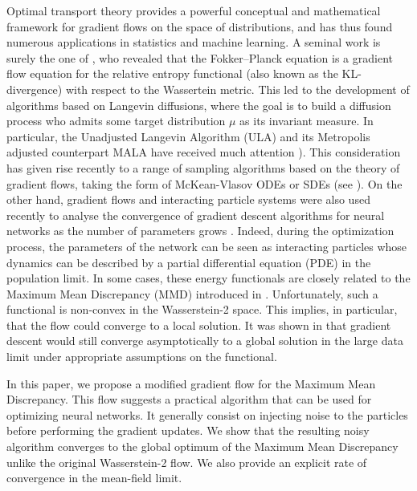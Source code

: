 Optimal transport   theory provides a powerful conceptual and mathematical framework for gradient flows on the space of distributions, and has thus found numerous applications in statistics and machine learning. A seminal work is surely the one of \cite{jordan1998variational}, who revealed that the Fokker–Planck equation is a gradient
flow equation for the relative entropy functional (also known as the KL-divergence) with respect to the Wassertein metric. %
This led to the development of algorithms based on Langevin diffusions, where the goal is to build a diffusion process who admits some target distribution $\mu$ as its invariant measure. In particular, the Unadjusted
Langevin Algorithm (ULA) and its Metropolis adjusted counterpart MALA have received much
attention \cite{durmus2018analysis}). This consideration has given rise recently to a range of sampling
algorithms based on the theory of gradient flows, taking the form of McKean-Vlasov ODEs or SDEs (see \cite{liu2017stein, csimcsekli2018sliced, bernton2018langevin}). On the other hand, gradient flows and interacting particle systems were also used recently to analyse the convergence of gradient descent algorithms for neural networks as the number of parameters grows \cite{chizat2018global,rotskoff2018neural,mei2018mean, sirignano2018mean, rotskoff2019global}. Indeed, during the optimization process, the parameters of the network can be seen as interacting particles whose dynamics can be described by a partial differential equation (PDE) in the population limit.%
In some cases, these energy functionals are closely related to the Maximum Mean Discrepancy (MMD) introduced in \cite{gretton2012kernel}. Unfortunately, such a functional is non-convex in the Wasserstein-2 space. This implies, in particular, that the flow could converge to a local solution.  It was shown in \cite{chizat2018global,rotskoff2019global} that gradient descent would still converge asymptotically to a global solution in the large data limit under appropriate assumptions on the functional. 

In this paper, we propose a modified gradient flow for the Maximum Mean Discrepancy. This flow suggests a practical algorithm that can be used for optimizing neural networks. It generally consist on injecting noise to the particles before performing the gradient updates. We show that the resulting noisy algorithm converges to the global optimum of the Maximum Mean Discrepancy unlike the original Wasserstein-2 flow. We also provide an explicit rate of convergence in the mean-field limit.  


